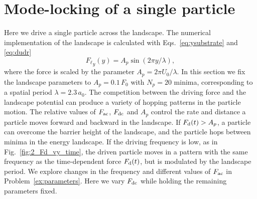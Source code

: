 \documentclass[preprint,showpacs,preprintnumbers,amsmath,amssymb,aps,prb]{revtex4-1}
\theoremstyle{remark}
\begin{document}
\section{Mode-locking of a single particle}
\label{sec:results}
Here we drive 
a single particle 
across the landscape. 
The numerical implementation of the landscape 
is calculated with Eqs.~\eqref{eq:ysubstrate} and \eqref{eq:dudr}  %
\begin{equation}
  \label{eq:force}
  {F_{\ell}}_y(y) = A_{p} \sin{(2 \pi y / \lambda)},
\end{equation}
where the force is scaled by the parameter $A_{p} = 2\pi U_0/\lambda$.
In this section we fix the landscape parameters
to $A_{p} = 0.1\,F_0$ 
with $N_p=20$ minima, 
corresponding to a spatial period $\lambda = 2.3\,a_0$.
The competition between the driving force and the landscape potential
can produce a variety of hopping patterns in the particle motion. 
The relative values of $F_{\rm ac}$, $F_{\rm dc}$ and $A_p$
control the rate and distance a  particle moves 
forward and backward in the landscape.
If $F_{\rm d}(t) > A_p$, a particle can 
overcome the barrier height of the landscape,
and 
the particle hops between minima in the energy landscape.
If the driving frequency is low,
as in Fig.~\ref{fig:2_Fd_vy_time},  
the driven particle 
moves 
in a pattern 
with the same frequency 
as the time-dependent force $F_{\rm d}(t)$,
but is modulated by the landscape period.
We explore changes in the frequency and different values of $F_{\rm ac}$ 
in Problem~\ref{ex:parameters}.
Here we vary $F_{\rm dc}$ 
while holding the remaining parameters fixed.
\end{document}
